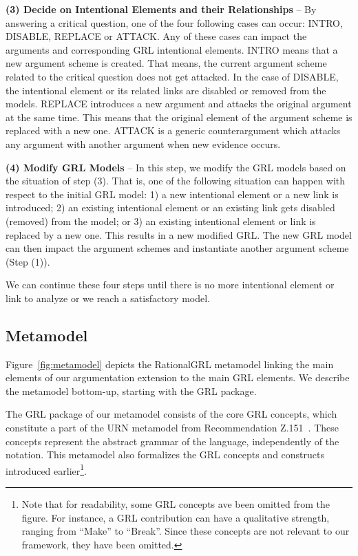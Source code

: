 \textbf{(3) Decide on Intentional Elements and their Relationships} -- By answering a critical question, one of the four following cases can occur: \textsf{INTRO}, \textsf{DISABLE}, \textsf{REPLACE} or \textsf{ATTACK}.  Any of these cases can  impact the arguments and corresponding GRL intentional elements.  \textsf{INTRO} means that 
a new argument scheme is created. That means, the current argument scheme related to the critical question does not get attacked.  In the case of \textsf{DISABLE}, the intentional element or its related links are disabled or removed from the models. \textsf{REPLACE} introduces a new argument and attacks the original argument at the same time. This means that the original element of the argument scheme is replaced with a new one. \textsf{ATTACK} is a generic counterargument which attacks any argument with another argument when new evidence occurs.  

\textbf{(4) Modify GRL Models} -- In this step, we modify the GRL models based on the situation of step (3). That is, one of the following situation can happen with respect to the initial GRL model: 1) a new intentional element or a new link is introduced; 2) an existing intentional element or an existing link gets disabled (removed) from the model; or 3) an existing intentional element or link is replaced by a new one. This results in a new modified GRL. The new GRL model can then impact the argument schemes and instantiate another argument scheme (Step (1)).   

We can continue these four steps until there is no more intentional element or link to analyze or we reach a satisfactory model. 

\subsection{Metamodel}

Figure~\ref{fig:metamodel} depicts the RationalGRL metamodel linking the main elements of our argumentation extension to the main GRL elements. We describe the metamodel bottom-up, starting with the GRL package.

The GRL package of our metamodel consists of the core GRL concepts, which constitute a part of
the URN metamodel from Recommendation Z.151~\cite{URN}. These concepts represent the abstract grammar of the language, independently of the notation. This metamodel also formalizes the GRL concepts and constructs introduced earlier\footnote{Note that for readability, some GRL concepts ave been omitted from the figure. For instance, a GRL contribution can have a qualitative strength, ranging from ``Make'' to ``Break''. Since these concepts are not relevant to our framework, they have been omitted.}.


